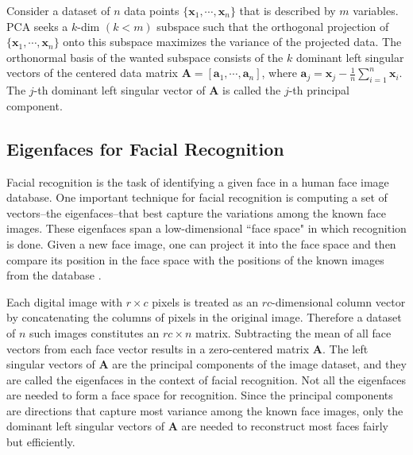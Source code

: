 \documentclass[11pt]{article}
\numberwithin{equation}{section}
\numberwithin{figure}{section}
\numberwithin{table}{section}
\begin{document}
Consider a dataset of $n$ data points $\{\mathbf{x}_1,\cdots,\mathbf{x}_n\}$ that is described by $m$ variables. PCA seeks a $k$-dim $(k < m)$ subspace such that the orthogonal projection of $\{\mathbf{x}_1,\cdots,\mathbf{x}_n\}$ onto this subspace maximizes the variance of the projected data. The orthonormal basis of the wanted subspace consists of the $k$ dominant left singular vectors of the centered data matrix $\mathbf{A} = [\mathbf{a}_1,\cdots,\mathbf{a}_n]$, where $\mathbf{a}_j = \mathbf{x}_j - \frac{1}{n}\sum_{i=1}^n\mathbf{x}_i$. The $j$-th dominant left singular vector of $\mathbf{A}$ is called the $j$-th principal component.



\subsection{Eigenfaces for Facial Recognition}
\label{eigenface}

Facial recognition \cite{monte_carlo_psvd}\cite{eigenface} is the task of identifying a given face in a human face image database. One important technique for facial recognition is computing a set of vectors--the eigenfaces--that best capture the variations among the known face images. These eigenfaces span a low-dimensional ``face space" in which recognition is done. Given a new face image, one can project it into the face space and then compare its position in the face space with the positions of the known images from the database \cite{eigenface}.

Each digital image with $r \times c$ pixels is treated as an $rc$-dimensional column vector by concatenating the columns of pixels in the original image. Therefore a dataset of $n$ such images constitutes an $rc \times n$ matrix. Subtracting the mean of all face vectors from each face vector results in a zero-centered matrix $\mathbf{A}$. The left singular vectors of $\mathbf{A}$ are the principal components \cite{PCA} of the image dataset, and they are called the eigenfaces in the context of facial recognition. Not all the eigenfaces are needed to form a face space for recognition. Since the principal components are directions that capture most variance among the known face images, only the dominant left singular vectors of $\mathbf{A}$ are needed to reconstruct most faces fairly but efficiently.
\end{document}
